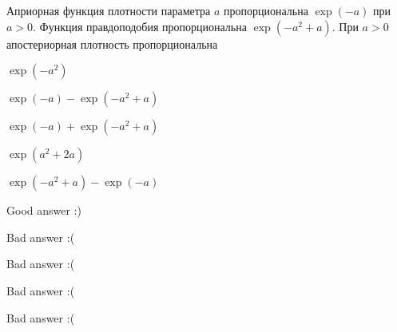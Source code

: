 
\begin{question}
Априорная функция плотности параметра \(a\) пропорциональна \(\exp(-a)\)
при \(a>0\). Функция правдоподобия пропорциональна \(\exp(-a^2+a)\). При
\(a>0\) апостериорная плотность пропорциональна
\begin{answerlist}
  \item \(\exp(-a^2)\)
  \item \(\exp(-a) - \exp(-a^2+a)\)
  \item \(\exp(-a) + \exp(-a^2+a)\)
  \item \(\exp(a^2+2a)\)
  \item \(\exp(-a^2+a) - \exp(-a)\)
\end{answerlist}
\end{question}

\begin{solution}
\begin{answerlist}
  \item Good answer :)
  \item Bad answer :(
  \item Bad answer :(
  \item Bad answer :(
  \item Bad answer :(
\end{answerlist}
\end{solution}

